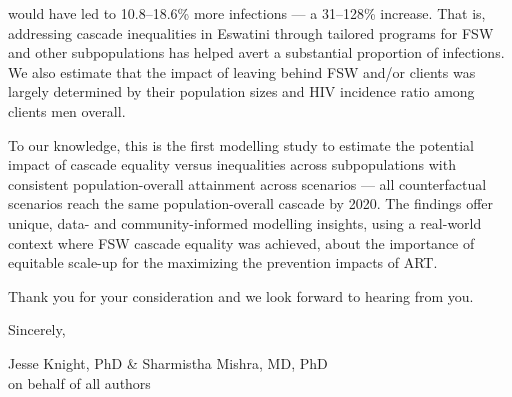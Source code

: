 would have led to 10.8--18.6\% more infections
--- a 31--128\% increase.
That is, addressing cascade inequalities in Eswatini
through tailored programs for FSW and other subpopulations
has helped avert a substantial proportion of infections.
We also estimate that the impact of
leaving behind FSW and/or clients was largely determined by
their population sizes and HIV incidence ratio among clients \vs men overall.
\par
To our knowledge, this is the first modelling study to estimate
the potential impact of cascade equality versus inequalities across subpopulations
with consistent population-overall attainment across scenarios ---
\ie all counterfactual scenarios reach the same population-overall cascade by 2020.
The findings offer unique, data- and community-informed modelling insights,
using a real-world context where FSW cascade equality was achieved,
about the importance of equitable scale-up
for the maximizing the prevention impacts of ART.
\par
Thank you for your consideration and we look forward to hearing from you.
\medskip\par
Sincerely,
\par
Jesse Knight, PhD \& Sharmistha Mishra, MD, PhD\\
on behalf of all authors
\restoregeometry%
